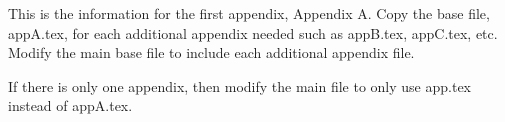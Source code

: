 %
%

This is the information for the first appendix, Appendix A. Copy the base file, appA.tex, for each additional appendix needed such as appB.tex, appC.tex, etc. Modify the main base file to include each additional appendix file.

If there is only one appendix, then modify the main file to only use app.tex instead of appA.tex.